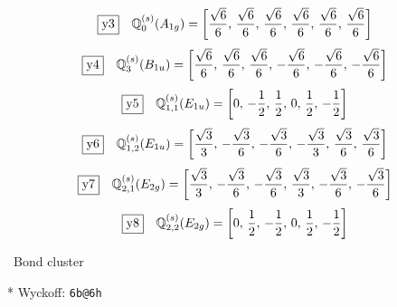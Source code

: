 \documentclass[fleqn,10pt,landscape]{jsarticle}
\begin{document}
\begin{dmath*}
\fbox{y3}\quad \mathbb{Q}_{0}^{(s)}(A_{1g})=\left[ \frac{\sqrt{6}}{6},\, \frac{\sqrt{6}}{6},\, \frac{\sqrt{6}}{6},\, \frac{\sqrt{6}}{6},\, \frac{\sqrt{6}}{6},\, \frac{\sqrt{6}}{6} \right]
\end{dmath*}
\begin{dmath*}
\fbox{y4}\quad \mathbb{Q}_{3}^{(s)}(B_{1u})=\left[ \frac{\sqrt{6}}{6},\, \frac{\sqrt{6}}{6},\, \frac{\sqrt{6}}{6},\, - \frac{\sqrt{6}}{6},\, - \frac{\sqrt{6}}{6},\, - \frac{\sqrt{6}}{6} \right]
\end{dmath*}
\begin{dmath*}
\fbox{y5}\quad \mathbb{Q}_{1,1}^{(s)}(E_{1u})=\left[ 0,\, - \frac{1}{2},\, \frac{1}{2},\, 0,\, \frac{1}{2},\, - \frac{1}{2} \right]
\end{dmath*}
\begin{dmath*}
\fbox{y6}\quad \mathbb{Q}_{1,2}^{(s)}(E_{1u})=\left[ \frac{\sqrt{3}}{3},\, - \frac{\sqrt{3}}{6},\, - \frac{\sqrt{3}}{6},\, - \frac{\sqrt{3}}{3},\, \frac{\sqrt{3}}{6},\, \frac{\sqrt{3}}{6} \right]
\end{dmath*}
\begin{dmath*}
\fbox{y7}\quad \mathbb{Q}_{2,1}^{(s)}(E_{2g})=\left[ \frac{\sqrt{3}}{3},\, - \frac{\sqrt{3}}{6},\, - \frac{\sqrt{3}}{6},\, \frac{\sqrt{3}}{3},\, - \frac{\sqrt{3}}{6},\, - \frac{\sqrt{3}}{6} \right]
\end{dmath*}
\begin{dmath*}
\fbox{y8}\quad \mathbb{Q}_{2,2}^{(s)}(E_{2g})=\left[ 0,\, \frac{1}{2},\, - \frac{1}{2},\, 0,\, \frac{1}{2},\, - \frac{1}{2} \right]
\end{dmath*}
\vspace{5mm}

\noindent\textbullet\, Bond cluster

\vspace{5mm}

\noindent ** Wyckoff: \texttt{6b@6h}
\end{document}

